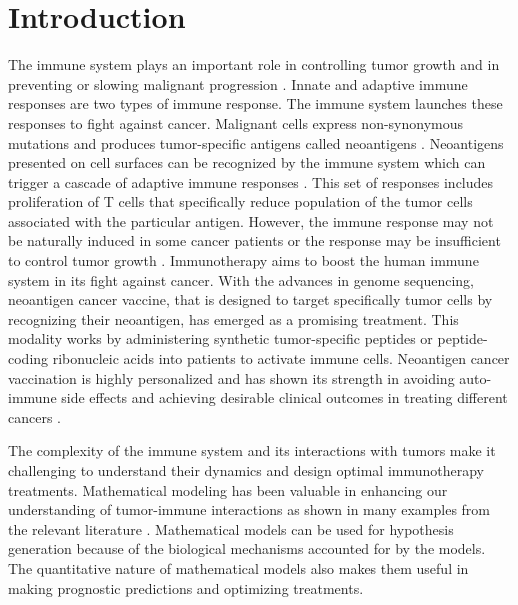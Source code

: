 \documentclass[review,authoryear]{elsarticle}
\begin{document}
\linenumbers

\section{Introduction}

The immune system plays an important role in controlling tumor growth
and in preventing or slowing malignant progression \citep{Waldman2020}. Innate and adaptive
immune responses are two types of immune response. The immune system
launches these responses to fight against cancer. Malignant cells express non-synonymous mutations
and produces tumor-specific antigens called neoantigens \citep{Peng2019}.
Neoantigens presented on cell surfaces can be recognized by the immune system which can trigger a cascade of adaptive
immune responses \citep{Zhang2021}. This set of responses includes proliferation of T cells
that specifically reduce population of the tumor cells associated with the particular antigen.
However, the immune response may not be naturally induced in some cancer patients or the response may be  insufficient to control tumor growth \citep{Ward2016}. Immunotherapy aims to boost the human immune system in its fight
against cancer. With the advances in genome sequencing, neoantigen
cancer vaccine, that is designed to target specifically tumor cells
by recognizing their neoantigen, has emerged as a promising treatment. This modality works by administering synthetic tumor-specific
peptides or peptide-coding ribonucleic acids into patients to activate immune cells. Neoantigen cancer vaccination is highly personalized and has shown its strength in avoiding auto-immune
side effects \citep{Nelde2021} and achieving desirable clinical outcomes in
treating different cancers
\citep[e.g.][]{Ott2017,Pan2018,Peng2019}. 

The complexity of the immune system and its interactions with tumors
make it challenging to understand their dynamics and design optimal
immunotherapy treatments. Mathematical modeling has been valuable in enhancing our understanding of tumor-immune interactions as shown in many examples from the relevant literature \citep[e.g., see reviews by][and references therein]{Eftimie2016,Mahlbacher2019,Nukala2021}. Mathematical models can be used for hypothesis
generation because of the biological mechanisms accounted for by the models. The
quantitative nature of mathematical models also makes them useful in making prognostic predictions and optimizing treatments. 
\end{document}
